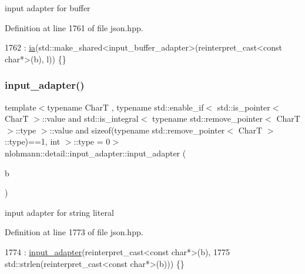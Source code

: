 input adapter for buffer 



Definition at line 1761 of file json.\+hpp.


\begin{DoxyCode}
1762         : \hyperlink{classnlohmann_1_1detail_1_1input__adapter_ad5a11d0b65b68f6950cfbe8c8366b7da}{ia}(std::make\_shared<input\_buffer\_adapter>(reinterpret\_cast<const char*>(b), l)) \{\}
\end{DoxyCode}
\mbox{\label{classnlohmann_1_1detail_1_1input__adapter_a86f035d9c4319360014b922b5e433ced}} 
\subsubsection{\texorpdfstring{input\+\_\+adapter()}{input\_adapter()}\hspace{0.1cm}{\footnotesize\ttfamily [4/7]}}
{\footnotesize\ttfamily template$<$typename CharT , typename std\+::enable\+\_\+if$<$ std\+::is\+\_\+pointer$<$ Char\+T $>$\+::value and std\+::is\+\_\+integral$<$ typename std\+::remove\+\_\+pointer$<$ Char\+T $>$\+::type $>$\+::value and sizeof(typename std\+::remove\+\_\+pointer$<$ Char\+T $>$\+::type)==1, int $>$\+::type  = 0$>$ \\
nlohmann\+::detail\+::input\+\_\+adapter\+::input\+\_\+adapter (\begin{DoxyParamCaption}\item[{CharT}]{b }\end{DoxyParamCaption})\hspace{0.3cm}{\ttfamily [inline]}}



input adapter for string literal 



Definition at line 1773 of file json.\+hpp.


\begin{DoxyCode}
1774         : \hyperlink{classnlohmann_1_1detail_1_1input__adapter_ae89f11268d4724b3080473f7218abe86}{input\_adapter}(reinterpret\_cast<const char*>(b),
1775                         std::strlen(reinterpret\_cast<const char*>(b))) \{\}
\end{DoxyCode}
\mbox{\label{classnlohmann_1_1detail_1_1input__adapter_ad6824b0f792691f75186c527fa31a6b4}} 
